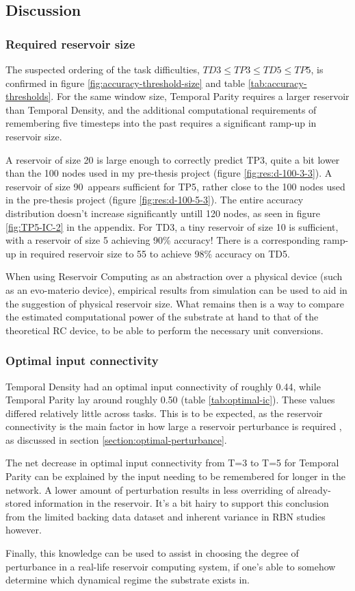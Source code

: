 \subsection{Discussion}

\subsubsection{Required reservoir size}

The suspected ordering of the task difficulties,
$ TD3 \leq TP3 \leq TD5 \leq TP5 $,
is confirmed in figure \ref{fig:accuracy-threshold-size} and table \ref{tab:accuracy-thresholds}.
For the same window size, Temporal Parity requires a larger reservoir than Temporal Density,
and the additional computational requirements of remembering five timesteps into the past requires a significant ramp-up in reservoir size.

A reservoir of size 20 is large enough to correctly predict TP3,
quite a bit lower than the 100 nodes used in my pre-thesis project (figure \ref{fig:res:d-100-3-3}).
A reservoir of size 90 appears sufficient for TP5, rather close to the 100 nodes used in the pre-thesis project (figure \ref{fig:res:d-100-5-3}).
The entire accuracy distribution doesn't increase significantly untill 120 nodes,
as seen in figure \ref{fig:TP5-IC-2} in the appendix.
For TD3, a tiny reservoir of size 10 is sufficient, with a reservoir of size 5 achieving 90\% accuracy!
There is a corresponding ramp-up in required reservoir size to 55 to achieve 98\% accuracy on TD5.

When using Reservoir Computing as an abstraction over a physical device (such as an evo-materio device),
empirical results from simulation can be used to aid in the suggestion of physical reservoir size.
What remains then is a way to compare the estimated computational power of the substrate at hand to that of the theoretical RC device,
to be able to perform the necessary unit conversions.

\subsubsection{Optimal input connectivity}

Temporal Density had an optimal input connectivity of roughly 0.44, while Temporal Parity lay around roughly 0.50 (table \ref{tab:optimal-ic}).
These values differed relatively little across tasks.
This is to be expected, as the reservoir connectivity is the main factor in how large a reservoir perturbance is required \cite{rbn-reservoir},
as discussed in section \ref{section:optimal-perturbance}.

The net decrease in optimal input connectivity from T=3 to T=5 for Temporal Parity can be explained by the input needing to be remembered for longer in the network.
A lower amount of perturbation results in less overriding of already-stored information in the reservoir.
It's a bit hairy to support this conclusion from the limited backing data dataset and inherent variance in RBN studies however.

Finally, this knowledge can be used to assist in choosing the degree of perturbance in a real-life reservoir computing system,
if one's able to somehow determine which dynamical regime the substrate exists in.
